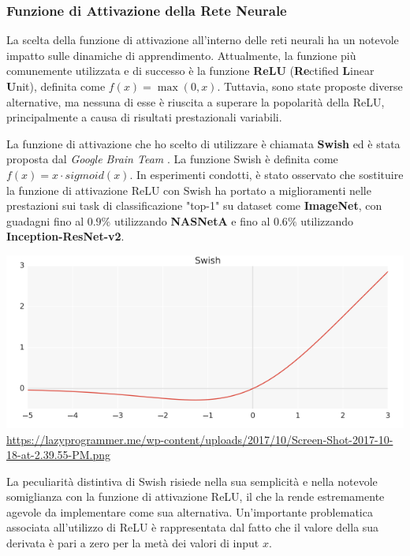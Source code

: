 \subsubsection*{Funzione di Attivazione della Rete Neurale}
La scelta della funzione di attivazione all'interno delle reti neurali 
ha un notevole impatto sulle dinamiche di apprendimento. Attualmente, 
la funzione più comunemente utilizzata e di successo è la funzione 
\textbf{ReLU} (\textbf{Re}ctified \textbf{L}inear \textbf{U}nit), 
definita come $f(x) = \max(0, x)$. Tuttavia, sono state proposte 
diverse alternative, ma nessuna di esse è riuscita a superare la 
popolarità della ReLU, principalmente a causa di risultati 
prestazionali variabili.

La funzione di attivazione che ho scelto di utilizzare è chiamata 
\textbf{Swish} ed è stata proposta dal \emph{Google Brain Team} 
\cite{ramachandran2017searching}. La funzione Swish è definita 
come $f(x) = x \cdot sigmoid(x)$. In esperimenti condotti, è 
stato osservato che sostituire la funzione di attivazione ReLU 
con Swish ha portato a miglioramenti nelle prestazioni sui task 
di classificazione "top-1" su dataset come \textbf{ImageNet}, con 
guadagni fino al $0.9\%$ utilizzando \textbf{NASNetA} e fino al 
$0.6\%$ utilizzando \textbf{Inception-ResNet-v2}.

\begin{minipage}{\linewidth}
	\centering
	\includegraphics[width=\textwidth]{img/Screen-Shot-2017-10-18-at-2.39.55-PM.png}
	\url{https://lazyprogrammer.me/wp-content/uploads/2017/10/Screen-Shot-2017-10-18-at-2.39.55-PM.png}
	\label{fig:swish}
\end{minipage}

La peculiarità distintiva di Swish risiede nella sua semplicità e 
nella notevole somiglianza con la funzione di attivazione ReLU, 
il che la rende estremamente agevole da implementare come sua alternativa. 
Un'importante problematica associata all'utilizzo di ReLU è 
rappresentata dal fatto che il valore della sua derivata è pari 
a zero per la metà dei valori di input $x$.

